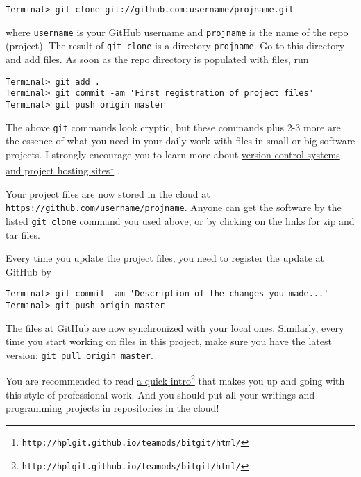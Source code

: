 \documentclass[graybox,sectrefs,envcountresetchap,open=right,final]{svmonodo}
\begin{document}
\begin{Verbatim}[frame=lines,label=\fbox{{\tiny Terminal}},framesep=2.5mm,framerule=0.7pt,fontsize=\fontsize{9pt}{9pt}]
Terminal> git clone git://github.com:username/projname.git
\end{Verbatim}
where \texttt{username} is your GitHub username and \texttt{projname} is the
name of the repo (project). The result of \texttt{git clone} is a
directory \texttt{projname}. Go to this directory and add files.
As soon as the repo directory is populated with files, run

\begin{Verbatim}[frame=lines,label=\fbox{{\tiny Terminal}},framesep=2.5mm,framerule=0.7pt,fontsize=\fontsize{9pt}{9pt}]
Terminal> git add .
Terminal> git commit -am 'First registration of project files'
Terminal> git push origin master
\end{Verbatim}
The above \texttt{git} commands look cryptic, but these commands plus
2-3 more are the essence of what you need in your daily work with
files in small or big
software projects. I strongly encourage you to
learn more about \href{{http://hplgit.github.io/teamods/bitgit/html/}}{version control systems and project hosting
sites}\footnote{\texttt{http://hplgit.github.io/teamods/bitgit/html/}}
\cite{Langtangen_bitgit}.

Your project files are now stored in the cloud at
\href{{https://github.com/username/projname}}{\nolinkurl{https://github.com/username/projname}}. Anyone can
get the software by the listed \texttt{git clone} command you used above,
or by clicking on the links for zip and tar files.

Every time you update the project files, you need to register
the update at GitHub by

\begin{Verbatim}[frame=lines,label=\fbox{{\tiny Terminal}},framesep=2.5mm,framerule=0.7pt,fontsize=\fontsize{9pt}{9pt}]
Terminal> git commit -am 'Description of the changes you made...'
Terminal> git push origin master
\end{Verbatim}
The files at GitHub are now synchronized with your local ones.
Similarly, every time you start working on files in this project,
make sure you have the latest version:
\texttt{git pull origin master}.

You are recommended to read \href{{http://hplgit.github.io/teamods/bitgit/html/}}{a quick intro}\footnote{\texttt{http://hplgit.github.io/teamods/bitgit/html/}} that makes you
up and going with this style of
professional work. And you should put all your writings and programming
projects in repositories in the cloud!
\end{document}
